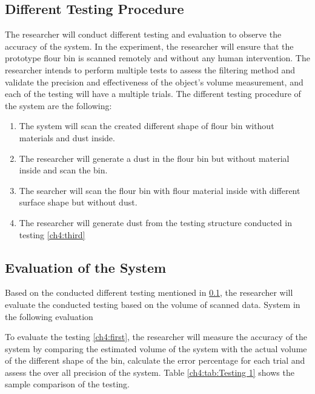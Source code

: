 \subsection{Different Testing Procedure}
\label{ch4:subsec:Different Testing Procedure}
The researcher will conduct different testing and evaluation to observe the accuracy of the system. In the experiment, the researcher will ensure that the prototype flour bin is scanned remotely and without any human intervention. The researcher intends to perform multiple tests to assess the filtering method and validate the precision and effectiveness of the object's volume measurement, and each of the testing will have a multiple trials. The different testing procedure of the system are the following:
\begin{enumerate}
	\item \label{ch4:first} The system will scan the created different shape of flour bin without materials and dust inside.
	\item \label{ch4:second} The researcher will generate a dust in the flour bin but without material inside and scan the bin.
	\item \label{ch4:third} The searcher will scan the flour bin with flour material inside with different surface shape but without dust.
	\item \label{ch4:fourth} The researcher will generate dust from the testing structure conducted in testing \ref{ch4:third}
\end{enumerate}

\subsection{Evaluation of the System}
\label{ch4:subsec:Evaluation of the System}
Based on the conducted different testing mentioned in \ref{ch4:subsec:Different Testing Procedure}, the researcher will evaluate the conducted testing based on the volume of scanned data. System in the following evaluation

To evaluate the testing \ref{ch4:first}, the researcher will measure the accuracy of the system by comparing the estimated volume of the system  with the actual volume of the different shape of the bin, calculate the error percentage for each trial and assess the over all precision of the system. Table \ref{ch4:tab:Testing 1} shows the sample comparison of the testing.

